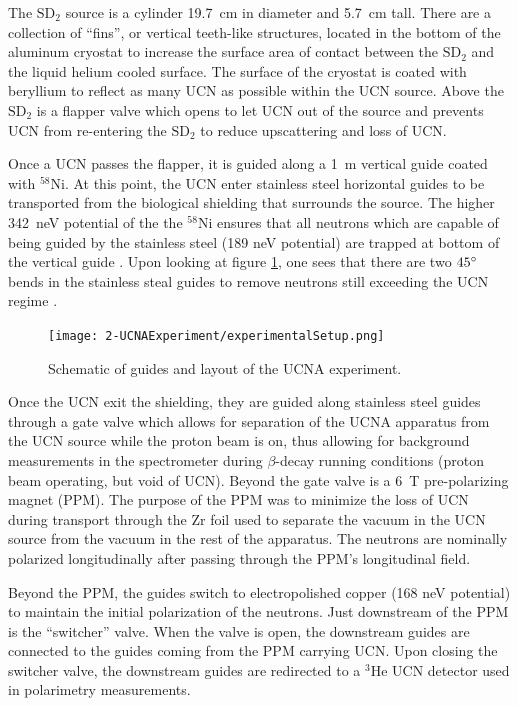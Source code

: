 The $\mathrm{SD}_2$ source is a cylinder 19.7~cm in diameter and 5.7~cm tall. There
are a collection of ``fins'', or vertical teeth-like structures, located in
the bottom of the aluminum cryostat to increase the surface area of contact between the
$\mathrm{SD}_2$ and the liquid helium cooled surface. The surface of the cryostat
is coated with beryllium to reflect as many UCN as possible within the UCN source. Above
the $\mathrm{SD}_2$ is a flapper valve which opens to let UCN out of the source and
prevents UCN from re-entering the $\mathrm{SD}_2$ to reduce upscattering and loss of UCN.

Once a UCN passes the flapper, it is guided along a 1~m vertical guide coated with $^{58}\mathrm{Ni}$.
At this point, the UCN enter stainless steel horizontal guides to be transported from
the biological shielding that surrounds the source. The higher 342~neV potential of the
the $^{58}\mathrm{Ni}$ ensures that all neutrons which are capable of being guided by the
stainless steel (189 neV potential) are trapped at bottom of the vertical guide
\cite{saunders2013performance}. Upon looking at figure \ref{fig:guides}, one sees that
there are two $45\degree$ bends in the stainless steal guides to remove neutrons still
exceeding the UCN regime \cite{plaster2012}.

\begin{figure}[h]
  \centering
  \texttt{[image: 2-UCNAExperiment/experimentalSetup.png]} 
  \caption{Schematic of guides and layout of the UCNA experiment.}
  \label{fig:guides}
\end{figure}

Once the UCN exit the shielding, they are guided along stainless steel guides
through a gate valve which allows for separation of the UCNA apparatus from the UCN
source while the proton beam is on, thus allowing for background measurements in
the spectrometer
during $\beta$-decay running conditions (proton beam operating, but void of UCN).
Beyond the gate valve is a 6~T pre-polarizing magnet (PPM). The purpose of the PPM
was to minimize the loss of UCN during transport through the Zr foil used to separate
the vacuum in the UCN source from the vacuum in the rest of the apparatus. The neutrons
are nominally polarized longitudinally after passing through the PPM's longitudinal field.

Beyond the PPM, the guides switch to electropolished copper (168 neV potential) to
maintain the initial polarization of the neutrons. Just downstream of the PPM
is the ``switcher'' valve. When the valve is open, the downstream guides are connected
to the guides coming from the PPM carrying UCN. Upon closing the switcher valve,
the downstream guides are redirected to a $^3\mathrm{He}$ 
UCN detector \cite{morris2009multi} used in polarimetry measurements.

